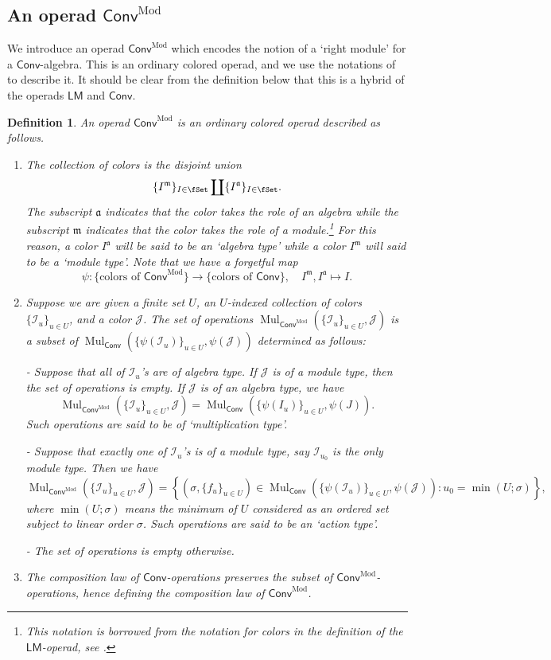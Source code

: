 \documentclass[10pt]{amsart}
\newtheorem{defn}[subsubsection]{Definition}
\theoremstyle{remark}
\newcommand{\mf}[1]{\mathfrak{#1}}
\newcommand{\te}{\text}
\newcommand{\on}{\operatorname}
\newcommand{\cI}{\mathcal{I}}
\newcommand{\cJ}{\mathcal{J}}
\newcommand{\Mul}{\on{Mul}}
\newcommand{\Conv}{\mathsf{Conv}}
\newcommand{\ConvMod}{\mathsf{Conv}^{\on{Mod}}}
\newcommand{\LM}{\mathsf{LM}}
\begin{document}
\subsection{An operad $\ConvMod$}\label{ssec: an operad ConvMod}
We introduce an operad $\ConvMod$ which encodes the notion of a `right module' for a $\Conv$-algebra. This is an ordinary colored operad, and we use the notations of \cite[Definition 2.1.1.1]{HA} to describe it. It should be clear from the definition below that this is a hybrid of the operads $\LM$ and $\Conv$.
\begin{defn}\label{def: operad ConvMod}
    An operad $\ConvMod$ is an ordinary colored operad described as follows.
    \begin{enumerate}
        \item The collection of colors is the disjoint union 
        \[ \{I^{\mf{m}}\}_{I\in\fSet}\coprod \{I^{\mf{a}}\}_{I\in\fSet}.\]
        The subscript $\mf{a}$ indicates that the color takes the role of an algebra while the subscript $\mf{m}$ indicates that the color takes the role of a module.\footnote{This notation is borrowed from the notation for colors in the definition of the $\LM$-operad, see \cite[Sect. 4.2.1]{HA}.} For this reason, a color $I^{\mf{a}}$ will be said to be an `algebra type' while a color $I^{\mf{m}}$ will said to be a `module type'. Note that we have a forgetful map
        \[\psi:\{\te{colors of }\ConvMod\}\rightarrow \{\te{colors of }\Conv\},\quad I^{\mf{m}}, I^{\mf{a}}\mapsto I.\]
        
        \item Suppose we are given a finite set $U$, an $U$-indexed collection of colors $\{\cI_u\}_{u\in U}$, and a color $\cJ$. The set of operations $\Mul_{\ConvMod}(\{\cI_u\}_{u\in U}, \cJ)$ is a subset of $\Mul_{\Conv}(\{\psi(\cI_u)\}_{u\in U},\psi(\cJ))$ determined as follows:
        \medskip
        
        - Suppose that all of $\cI_u$'s are of algebra type. If $\cJ$ is of a module type, then the set of operations is empty. If $\cJ$ is of an algebra type, we have
        \[\Mul_{\ConvMod}(\{\cI_u\}_{u\in U}, \cJ)=\Mul_{\Conv}(\{\psi(I_u)\}_{u\in U}, \psi(J)).\]
        Such operations are said to be of `multiplication type'.
    \medskip
    
        - Suppose that exactly one of $\cI_u$'s is of a module type, say  $\cI_{u_0}$ is the only module type. Then we have
        \[\Mul_{\ConvMod}(\{\cI_u\}_{u\in U}, \cJ)=\left\{(\sigma,\{f_u\}_{u\in U})\in \Mul_{\Conv}(\{\psi(\cI_u)\}_{u\in U}, \psi(\cJ)): u_0=\on{min}(U;\sigma)\right\},\]
        where $\on{min}(U;\sigma)$ means the minimum of $U$ considered as an ordered set subject to linear order $\sigma$. Such operations are said to be an `action type'.
        \medskip

        - The set of operations is empty otherwise.
        
        \item The composition law of $\Conv$-operations preserves the subset of $\ConvMod$-operations, hence defining the composition law of $\ConvMod$.
    \end{enumerate}
\end{defn}
\end{document}
